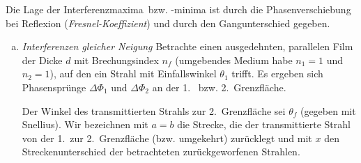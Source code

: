 Die Lage der Interferenzmaxima~bzw. -minima ist durch die
Phasenverschiebung bei Reflexion
(\emph{Fresnel-Koeffizient}) und durch den
Gangunterschied gegeben.
\begin{enumerate}[a)]
\item \emph{Interferenzen gleicher Neigung}
  Betrachte einen ausgedehnten, parallelen Film der Dicke
  $d$ mit Brechungsindex
  $n_f$ (umgebendes Medium habe $n_1=1$ und $n_2=1$), auf den ein Strahl mit
  Einfallswinkel $\theta_1$ trifft. 
  Es ergeben sich Phasensprünge $\Delta\Phi_1$ und $\Delta\Phi_2$ an der
  1.~ bzw. 2.~Grenzfläche.

  Der Winkel des transmittierten Strahls zur 2.~Grenzfläche sei
  $\theta_f$ (gegeben mit Snellius).
  Wir bezeichnen mit $a=b$ die Strecke, die der transmittierte Strahl
  von der 1.~zur 2.~Grenzfläche (bzw. umgekehrt) zurücklegt und mit $x$
  den Streckenunterschied der betrachteten zurückgeworfenen Strahlen.


\end{enumerate}
